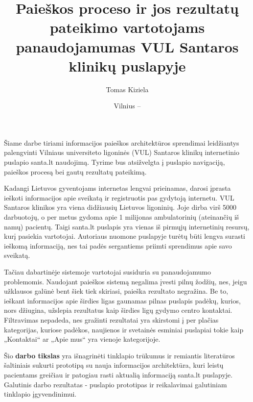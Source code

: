 \documentclass{VUMIFPSkursinis}
\title{Paieškos proceso ir jos rezultatų pateikimo vartotojams panaudojamumas VUL Santaros klinikų puslapyje}
\author{Tomas Kiziela}
\date{Vilnius – \the\year}
\begin{document}
	
\maketitle
\cleardoublepage{}
\setcounter{page}{2}

\tableofcontents



Šiame darbe tiriami informacijos paieškos architektūros sprendimai leidžiantys palengvinti Vilniaus universiteto ligoninės (VUL) Santaros klinikų internetinio puslapio santa.lt naudojimą. Tyrime bus atsižvelgta į puslapio navigaciją, paieškos procesą bei gautų rezultatų pateikimą.

Kadangi Lietuvos gyventojams internetas lengvai prieinamas, darosi įprasta ieškoti informacijos apie sveikatą ir registruotis pas gydytoją internetu\cite{InternetUseByPublicSAEn}\cite{InternetUseByPublicHKEn}. VUL Santaros klinikos yra viena didžiausių Lietuvos ligoninių. Joje dirba virš 5000 darbuotojų, o per metus gydoma apie 1 milijonas ambulatorinių (ateinančių iš namų) pacientų\cite{VulSkApieMusLt}. Taigi santa.lt puslapis yra vienas iš pirmųjų internetinių resursų, kurį pasiekia vartotojai. Autoriaus nuomone puslapyje turėtų būti lengva surasti ieškomą informaciją, nes tai padės sergantiems priimti sprendimus apie savo sveikatą.

Tačiau dabartinėje sistemoje vartotojai susiduria su panaudojamumo problemomis. Naudojant paieškos sistemą negalima įvesti pilnų žodžių, nes, jeigu užklausos galūnė bent šiek tiek skiriasi, paieška rezultato negražina. Be to, ieškant informacijos apie širdies ligas gaunamas pilnas puslapis padėkų, kurios, nors džiugina, užslepia rezultatus kaip širdies ligų gydymo centro kontaktai. Filtravimas nepadeda, nes gražinti rezultatai yra skirstomi į per plačias kategorijas, kuriose padėkos, naujienos ir svetainės esminiai puslapiai tokie kaip „Kontaktai“ ar „Apie mus“ yra vienoje kategorijoje. 

Šio \textbf{darbo tikslas} yra išnagrinėti tinklapio trūkumus ir remiantis literatūros šaltiniais sukurti prototipą su nauja informacijos architektūra, kuri leistų pacientams greičiau ir patogiau rasti aktualią informaciją santa.lt puslapyje. Galutinis darbo rezultatas - puslapio prototipas ir reikalavimai galutiniam tinklapio įgyvendinimui.
\end{document}
